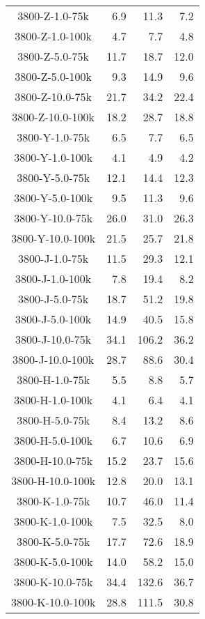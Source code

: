 \begin{longtable}{crrr}
    3800-Z-1.0-75k &   6.9 &   11.3 &   7.2 \\
    3800-Z-1.0-100k &   4.7 &    7.7 &   4.8 \\
    3800-Z-5.0-75k &  11.7 &   18.7 &  12.0 \\
    3800-Z-5.0-100k &   9.3 &   14.9 &   9.6 \\
    3800-Z-10.0-75k &  21.7 &   34.2 &  22.4 \\
    3800-Z-10.0-100k &  18.2 &   28.7 &  18.8 \\
    3800-Y-1.0-75k &   6.5 &    7.7 &   6.5 \\
    3800-Y-1.0-100k &   4.1 &    4.9 &   4.2 \\
    3800-Y-5.0-75k &  12.1 &   14.4 &  12.3 \\
    3800-Y-5.0-100k &   9.5 &   11.3 &   9.6 \\
    3800-Y-10.0-75k &  26.0 &   31.0 &  26.3 \\
    3800-Y-10.0-100k &  21.5 &   25.7 &  21.8 \\
    3800-J-1.0-75k &  11.5 &   29.3 &  12.1 \\
    3800-J-1.0-100k &   7.8 &   19.4 &   8.2 \\
    3800-J-5.0-75k &  18.7 &   51.2 &  19.8 \\
    3800-J-5.0-100k &  14.9 &   40.5 &  15.8 \\
    3800-J-10.0-75k &  34.1 &  106.2 &  36.2 \\
    3800-J-10.0-100k &  28.7 &   88.6 &  30.4 \\
    3800-H-1.0-75k &   5.5 &    8.8 &   5.7 \\
    3800-H-1.0-100k &   4.1 &    6.4 &   4.1 \\
    3800-H-5.0-75k &   8.4 &   13.2 &   8.6 \\
    3800-H-5.0-100k &   6.7 &   10.6 &   6.9 \\
    3800-H-10.0-75k &  15.2 &   23.7 &  15.6 \\
    3800-H-10.0-100k &  12.8 &   20.0 &  13.1 \\
    3800-K-1.0-75k &  10.7 &   46.0 &  11.4 \\
    3800-K-1.0-100k &   7.5 &   32.5 &   8.0 \\
    3800-K-5.0-75k &  17.7 &   72.6 &  18.9 \\
    3800-K-5.0-100k &  14.0 &   58.2 &  15.0 \\
    3800-K-10.0-75k &  34.4 &  132.6 &  36.7 \\
    3800-K-10.0-100k &  28.8 &  111.5 &  30.8 \\

\end{longtable}
